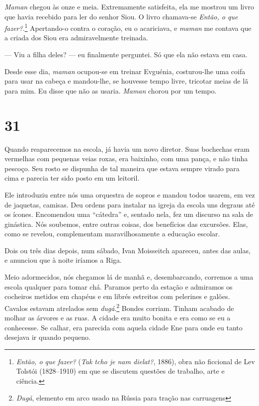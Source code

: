 \emph{Maman} chegou às onze e meia. Extremamente satisfeita, ela me
mostrou um livro que havia recebido para ler do senhor Siou. O livro
chamava-se \emph{Então, o que fazer?}.\footnote{\emph{Então, o que
  fazer?} (\emph{Tak tcho je nam dielat?}, 1886), obra não
  ficcional de Lev Tolstói (1828--1910) em que se discutem questões de
  trabalho, arte e ciência.} Apertando-o contra o coração, eu o
acariciava, e \emph{maman} me contava que a criada dos Siou era
admiravelmente treinada.

--- Viu a filha deles? --- eu finalmente perguntei. Só que ela não
estava em casa.

Desde esse dia, \emph{maman} ocupou-se em treinar Evguénia, costurou-lhe
uma coifa para usar na cabeça e mandou-lhe, se houvesse tempo livre,
tricotar meias de lã para mim. Eu disse que não as usaria. \emph{Maman}
chorou por um tempo.

\section{31}

Quando reaparecemos na escola, já havia um novo diretor. Suas bochechas
eram vermelhas com pequenas veias roxas, era baixinho, com uma pança, e
não tinha pescoço. Seu rosto se dispunha de tal maneira que estava
sempre virado para cima e parecia ter sido posto em um leitoril.

Ele introduziu entre nós uma orquestra de sopros e mandou todos usarem,
em vez de jaquetas, camisas. Deu ordens para instalar na igreja da
escola uns degraus até os ícones. Encomendou uma ``cátedra'' e, sentado
nela, fez um discurso na sala de ginástica. Nós soubemos, entre outras
coisas, dos benefícios das excursões. Elas, como se revelou,
complementam maravilhosamente a educação escolar.

Dois ou três dias depois, num sábado, Ivan Moisseitch apareceu, antes
das aulas, e anunciou que à noite iríamos a Riga.

Meio adormecidos, nós chegamos lá de manhã e, desembarcando, corremos a
uma escola qualquer para tomar chá. Paramos perto da estação e admiramos
os cocheiros metidos em chapéus e em librés estreitos com pelerines e
galões. Cavalos estavam atrelados sem \emph{dugá}.\footnote{\emph{Dugá},
  elemento em arco usado na Rússia para tração nas carruagens} Bondes
corriam. Tinham acabado de molhar as árvores e as ruas. A cidade era
muito bonita e era como se eu a conhecesse. Se calhar, era parecida com
aquela cidade Ene para onde eu tanto desejava ir quando pequeno.

